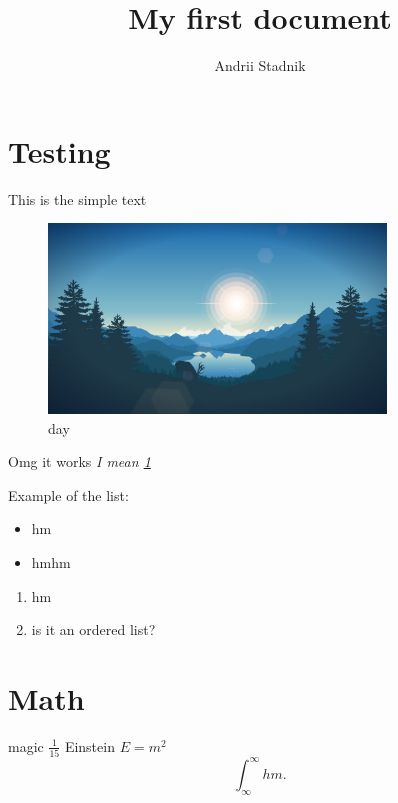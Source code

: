 \documentclass[a4paper]{article}
\title{My first document}
\author{Andrii Stadnik}
\begin{document}
	\maketitle
	\tableofcontents
	\section{Testing}
	This is the simple text

	\begin{figure}[h]
		\centering
		\includegraphics[width=0.8\textwidth]{day}
		\caption{day}
		\label{fig:day}
	\end{figure}

	Omg it works \emph{I mean \ref{fig:day}}
	
	Example of the list:

	\begin{itemize}
		\item hm
		\item hmhm
	\end{itemize}

	\begin{enumerate}
		\item hm
		\item is it an ordered list?
	\end{enumerate}

	\section{Math}

	magic $\frac{1}{15}$
	Einstein $E=m^2$
	\[
		\int_{\infty}^{\infty} hm 
	.\] 


\end{document}
